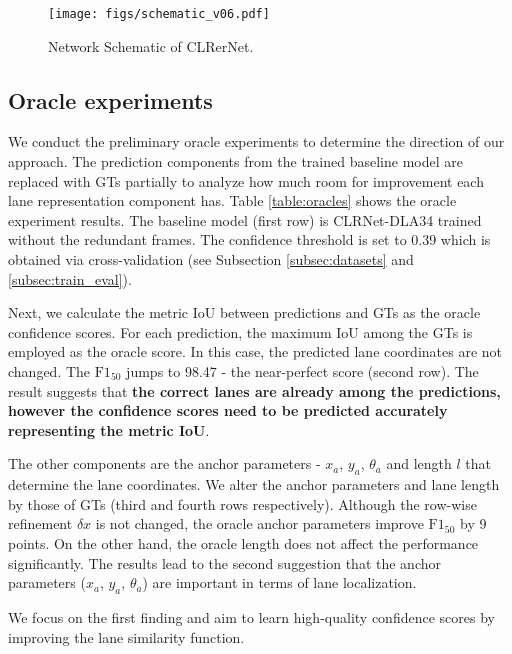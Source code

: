 \documentclass[10pt,twocolumn,letterpaper]{article}
\begin{document}
\begin{figure*}[t]
\begin{center}
    \texttt{[image: figs/schematic\_v06.pdf]}
\end{center}
   \caption{Network Schematic of CLRerNet.}
\label{fig:long}
\label{fig:schematic}
\end{figure*}


\subsection{Oracle experiments}\label{subsection:oracle}

We conduct the preliminary oracle experiments to determine the direction of our approach. The prediction components from the trained baseline model are replaced with GTs partially to analyze how much room for improvement each lane representation component has.
Table \ref{table:oracles} shows the oracle experiment results. The baseline model (first row) is CLRNet-DLA34 trained without the redundant frames. The confidence threshold is set to 0.39 which is obtained via cross-validation (see Subsection \ref{subsec:datasets} and \ref{subsec:train_eval}).

Next, we calculate the metric IoU between predictions and GTs as the oracle confidence scores. For each prediction, the maximum IoU among the GTs is employed as the oracle score. In this case, the predicted lane coordinates are not changed. The $\text{F1}_{50}$ jumps to 98.47 - the near-perfect score (second row). The result suggests that \textbf{the correct lanes are already among the predictions, however the confidence scores need to be predicted accurately representing the metric IoU}.

The other components are the anchor parameters - $x_a$, $y_a$, $\theta_a$ and length $l$ that determine the lane coordinates. We alter the anchor parameters and lane length by those of GTs (third and fourth rows respectively). Although the row-wise refinement $\delta x$ is not changed, the oracle anchor parameters improve $\text{F1}_{50}$ by 9 points. On the other hand, the oracle length does not affect the performance significantly. The results lead to the second suggestion that the anchor parameters ($x_a$, $y_a$, $\theta_a$) are important in terms of lane localization. 

We focus on the first finding and aim to learn high-quality confidence scores by improving the lane similarity function.
\end{document}
